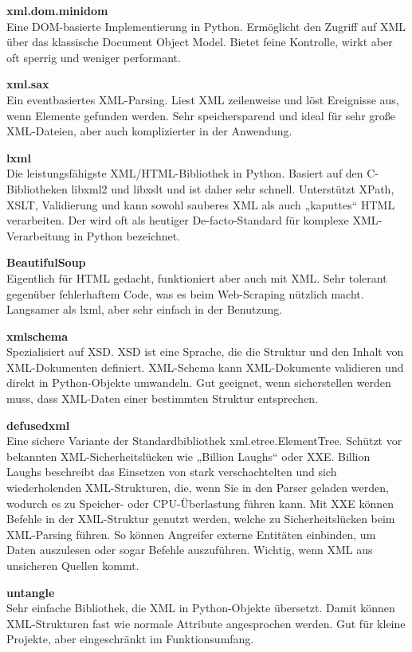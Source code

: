 \textbf{xml.dom.minidom}\\
Eine DOM-basierte Implementierung in Python.
Ermöglicht den Zugriff auf XML über das klassische Document Object Model.
Bietet feine Kontrolle, wirkt aber oft sperrig und weniger performant. \cite*{xml.dom.minidom}

\textbf{xml.sax}\\
Ein eventbasiertes XML-Parsing.
Liest XML zeilenweise und löst Ereignisse aus, wenn Elemente gefunden werden.
Sehr speichersparend und ideal für sehr große XML-Dateien, aber auch komplizierter in der Anwendung. \cite*{xml.sax}

\textbf{lxml}\\
Die leistungsfähigste XML/HTML-Bibliothek in Python.
Basiert auf den C-Bibliotheken libxml2 und libxslt und ist daher sehr schnell.
Unterstützt XPath, \ac{XSLT}, Validierung und kann sowohl sauberes XML als auch „kaputtes“ HTML verarbeiten.
Der wird oft als heutiger De-facto-Standard für komplexe XML-Verarbeitung in Python bezeichnet. \cite*{lxml}

\textbf{BeautifulSoup}\\
Eigentlich für HTML gedacht, funktioniert aber auch mit XML. Sehr tolerant gegenüber fehlerhaftem Code, was es beim Web-Scraping nützlich macht.
Langsamer als lxml, aber sehr einfach in der Benutzung. \cite*{BeautifulSoup}

\textbf{xmlschema}\\
Spezialisiert auf \ac{XSD}.
\ac{XSD} ist eine Sprache, die die Struktur und den Inhalt von XML-Dokumenten definiert.
XML-Schema kann XML-Dokumente validieren und direkt in Python-Objekte umwandeln.
Gut geeignet, wenn sicherstellen werden muss, dass XML-Daten einer bestimmten Struktur entsprechen. \cite*{xmlschema}

\textbf{defusedxml}\\
Eine sichere Variante der Standardbibliothek xml.etree.ElementTree.
Schützt vor bekannten XML-Sicherheitslücken wie „Billion Laughs“ oder \ac{XXE}.
Billion Laughs beschreibt das Einsetzen von stark verschachtelten und sich wiederholenden \ac{XML}-Strukturen, die, wenn Sie in
den Parser geladen werden, wodurch es zu Speicher- oder CPU-Überlastung führen kann.
Mit \ac{XXE} können Befehle in der XML-Struktur genutzt werden, welche zu Sicherheitslücken beim XML-Parsing führen.
So können Angreifer externe Entitäten einbinden, um Daten auszulesen oder sogar Befehle auszuführen.
Wichtig, wenn XML aus unsicheren Quellen kommt. \cite*{defusedxml}

\textbf{untangle}\\
Sehr einfache Bibliothek, die XML in Python-Objekte übersetzt.
Damit können XML-Strukturen fast wie normale Attribute angesprochen werden.
Gut für kleine Projekte, aber eingeschränkt im Funktionsumfang. \cite*{untangle}